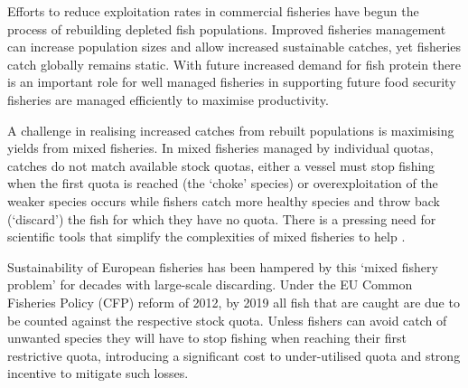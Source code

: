 \documentclass{nature}
\begin{document}
\begin{linenumbers}
 Efforts to reduce exploitation rates in commercial fisheries
have begun the process of rebuilding depleted fish populations\cite{Worm2009}.
Improved fisheries management can increase
population sizes and allow increased sustainable catches, yet fisheries catch
globally remains static\cite{FAO2016}. With future increased demand for fish
protein there is an important role for well managed
fisheries in supporting future food
security\cite{Mcclanahan2015}
 fisheries are
managed efficiently to maximise productivity.

A challenge in realising increased catches
from rebuilt populations is maximising yields from mixed
fisheries\cite{Branch2008, Kuriyama2016, Ulrich2016}. In mixed
fisheries managed by
individual quotas,  catches do not match
available stock quotas, either a vessel must stop fishing when the first quota
is reached (the `choke' species) or overexploitation of the weaker species
occurs while fishers catch more healthy species and throw
back (`discard') the fish for which they have no quota\cite{Batsleer2015}.
There is a pressing need for scientific tools that
simplify the complexities of mixed fisheries to help . 

Sustainability of European fisheries has been hampered by this `mixed fishery
problem' for decades with large-scale discarding\cite{Uhlmann2014}. Under the EU Common Fisheries
Policy (CFP) reform of 2012, by 2019 all fish that are caught are due to be counted against
the respective stock quota.
Unless
fishers can avoid catch of unwanted species they will have to stop fishing when
reaching their first restrictive quota, introducing
a significant cost to under-utilised
quota\cite{Ulrich2016} and strong incentive to mitigate such
losses\cite{Condie2013}. 


\end{linenumbers}
\end{document}
